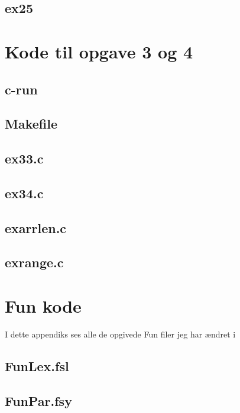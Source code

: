 \documentclass[danish,a4paper]{report}
\begin{document}
\section*{ex25}


\chapter{Kode til opgave 3 og 4}
\section*{c-run}

\section*{Makefile}

\section*{ex33.c}

\section*{ex34.c}

\section*{exarrlen.c}

\section*{exrange.c}


\chapter{Fun kode}

I dette appendiks ses alle de opgivede Fun filer jeg har ændret i

\section*{FunLex.fsl}

\section*{FunPar.fsy}

\end{document}
